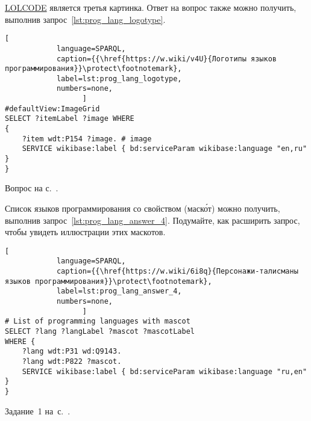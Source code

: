 \begin{task}
\label{answer:prog_lang_2}
    \href{https://ru.wikipedia.org/wiki/LOLCODE}{LOLCODE} является третья картинка. 
    Ответ на вопрос также можно получить, выполнив запрос~\ref{lst:prog_lang_logotype}. 
\begin{lstlisting}[
            language=SPARQL, 
            caption={{\href{https://w.wiki/v4U}{Логотипы языков программирования}}\protect\footnotemark}, 
            label=lst:prog_lang_logotype,
            numbers=none,
                  ]
#defaultView:ImageGrid
SELECT ?itemLabel ?image WHERE
{
    ?item wdt:P154 ?image. # image
    SERVICE wikibase:label { bd:serviceParam wikibase:language "en,ru" }
}
\end{lstlisting}

\small{\AnswerBackref Вопрос на с.~\pageref{question:prog_lang_2}.}
\end{task}



\newpage
\begin{task}
    \label{answer:prog_langs_4}
    Список языков программирования со свойством  (маск\'{о}т)
    можно получить, выполнив запрос~\ref{lst:prog_lang_answer_4}. 
    Подумайте, как расширить запрос, чтобы увидеть иллюстрации этих маскотов.

\begin{lstlisting}[
            language=SPARQL, 
            caption={{\href{https://w.wiki/6i8q}{Персонажи-талисманы языков программирования}}\protect\footnotemark}, 
            label=lst:prog_lang_answer_4,
            numbers=none,
                  ]
# List of programming languages with mascot
SELECT ?lang ?langLabel ?mascot ?mascotLabel
WHERE {
    ?lang wdt:P31 wd:Q9143.
    ?lang wdt:P822 ?mascot.
    SERVICE wikibase:label { bd:serviceParam wikibase:language "ru,en" }
}
\end{lstlisting}
    
    \small{Задание~1 на~с.~\pageref{prog_lang_test}.}
\end{task}




